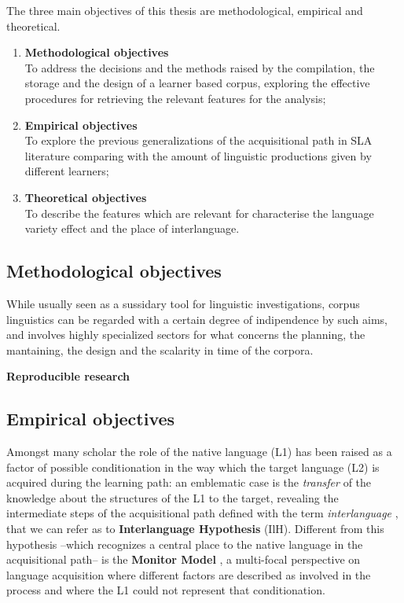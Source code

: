 \documentclass[a4paper,twoside,12pt,chapterprefix=false,bibliography=totocnumbered,listof=flat]{scrbook}
\providecommand{\tightlist}{%
  \setlength{\itemsep}{0pt}\setlength{\parskip}{0pt}}
\theoremstyle{definition}
\theoremstyle{definition}
\theoremstyle{definition}
\theoremstyle{remark}
\begin{document}
The three main objectives of this thesis are methodological, empirical
and theoretical.

\begin{enumerate}
\def\labelenumi{\arabic{enumi}.}
\tightlist
\item
  \textbf{Methodological objectives}\\
  To address the decisions and the methods raised by the compilation,
  the storage and the design of a learner based corpus, exploring the
  effective procedures for retrieving the relevant features for the
  analysis;
\item
  \textbf{Empirical objectives}\\
  To explore the previous generalizations of the acquisitional path in
  SLA literature comparing with the amount of linguistic productions
  given by different learners;
\item
  \textbf{Theoretical objectives}\\
  To describe the features which are relevant for characterise the
  language variety effect and the place of interlanguage.
\end{enumerate}

\subsection{Methodological objectives}\label{methodological-objectives}

While usually seen as a sussidary tool for linguistic investigations,
corpus linguistics can be regarded with a certain degree of indipendence
by such aims, and involves highly specialized sectors for what concerns
the planning, the mantaining, the design and the scalarity in time of
the corpora.

\textbf{Reproducible research}

\subsection{Empirical objectives}\label{empirical-objectives}

Amongst many scholar the role of the native language (L1) has been
raised as a factor of possible conditionation in the way which the
target language (L2) is acquired during the learning path: an emblematic
case is the \emph{transfer} of the knowledge about the structures of the
L1 to the target, revealing the intermediate steps of the acquisitional
path defined with the term \emph{interlanguage} \citep{selinker1972},
that we can refer as to \textbf{Interlanguage Hypothesis} (IlH).
Different from this hypothesis --which recognizes a central place to the
native language in the acquisitional path-- is the \textbf{Monitor
Model} \citep{krashen1981}, a multi-focal perspective on language
acquisition where different factors are described as involved in the
process and where the L1 could not represent that conditionation.
\end{document}
